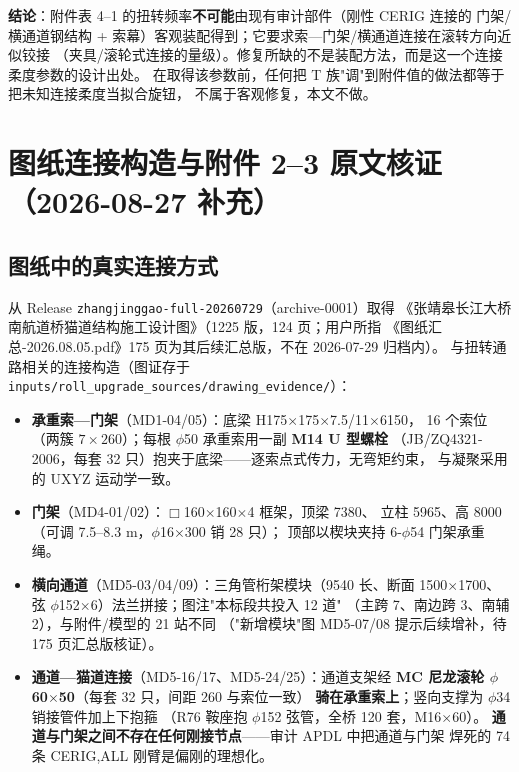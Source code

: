 \documentclass[11pt,a4paper]{ctexart}
\begin{document}
\textbf{结论}：附件表 4--1 的扭转频率\textbf{不可能}由现有审计部件（刚性 CERIG 连接的
门架/横通道钢结构 + 索幕）客观装配得到；它要求索—门架/横通道连接在滚转方向近似铰接
（夹具/滚轮式连接的量级）。修复所缺的不是装配方法，而是这一个连接柔度参数的设计出处。
在取得该参数前，任何把 T 族"调"到附件值的做法都等于把未知连接柔度当拟合旋钮，
不属于客观修复，本文不做。

\section{图纸连接构造与附件 2--3 原文核证（2026-08-27 补充）}\label{sec:drawings}

\subsection{图纸中的真实连接方式}

从 Release \texttt{zhangjinggao-full-20260729}（archive-0001）取得
《张靖皋长江大桥南航道桥猫道结构施工设计图》（1225 版，124 页；用户所指
《图纸汇总-2026.08.05.pdf》175 页为其后续汇总版，不在 2026-07-29 归档内）。
与扭转通路相关的连接构造（图证存于 \texttt{inputs/roll\_upgrade\_sources/drawing\_evidence/}）：

\begin{itemize}
  \item \textbf{承重索—门架}（MD1-04/05）：底梁 H175$\times$175$\times$7.5/11$\times$6150，
        16 个索位（两簇 $7\times260$）；每根 $\phi$50 承重索用一副 \textbf{M14 U 型螺栓}
        （JB/ZQ4321-2006，每套 32 只）抱夹于底梁——逐索点式传力，无弯矩约束，
        与凝聚采用的 UXYZ 运动学一致。
  \item \textbf{门架}（MD4-01/02）：$\Box$160$\times$160$\times$4 框架，顶梁 7380、
        立柱 5965、高 8000（可调 7.5--8.3 m，$\phi$16$\times$300 销 28 只）；
        顶部以楔块夹持 6-$\phi$54 门架承重绳。
  \item \textbf{横向通道}（MD5-03/04/09）：三角管桁架模块（9540 长、断面
        1500$\times$1700、弦 $\phi$152$\times$6）法兰拼接；图注"本标段共投入 12 道"
        （主跨 7、南边跨 3、南辅 2），与附件/模型的 21 站不同
        （"新增模块"图 MD5-07/08 提示后续增补，待 175 页汇总版核证）。
  \item \textbf{通道—猫道连接}（MD5-16/17、MD5-24/25）：通道支架经
        \textbf{MC 尼龙滚轮 $\phi$60$\times$50}（每套 32 只，间距 260 与索位一致）
        \textbf{骑在承重索上}；竖向支撑为 $\phi$34 销接管件加上下抱箍
        （R76 鞍座抱 $\phi$152 弦管，全桥 120 套，M16$\times$60）。
        \textbf{通道与门架之间不存在任何刚接节点}——审计 APDL 中把通道与门架
        焊死的 74 条 CERIG,ALL 刚臂是偏刚的理想化。
\end{itemize}
\end{document}
